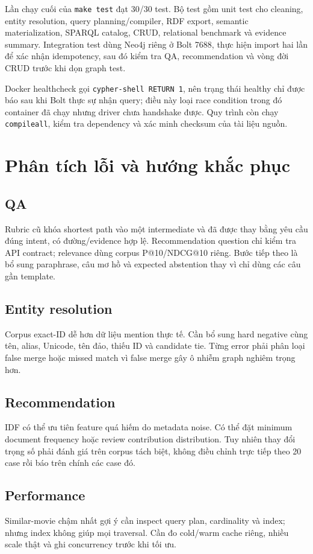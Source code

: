 Lần chạy cuối của \texttt{make test} đạt 30/30 test. Bộ test gồm unit test cho cleaning,
entity resolution, query planning/compiler, RDF export, semantic materialization,
SPARQL catalog, CRUD, relational benchmark và evidence summary. Integration test
dùng Neo4j riêng ở Bolt 7688, thực hiện import hai lần để xác nhận idempotency,
sau đó kiểm tra QA, recommendation và vòng đời CRUD trước khi dọn graph test.

Docker healthcheck gọi \texttt{cypher-shell RETURN 1}, nên trạng thái healthy chỉ được
báo sau khi Bolt thực sự nhận query; điều này loại race condition trong đó
container đã chạy nhưng driver chưa handshake được. Quy trình còn chạy
\texttt{compileall}, kiểm tra dependency và xác minh checksum của tài liệu nguồn.

\section{Phân tích lỗi và hướng khắc phục}

\subsection{QA}

Rubric cũ khóa shortest path vào một intermediate và đã được thay bằng yêu cầu
đúng intent, có đường/evidence hợp lệ. Recommendation question chỉ kiểm tra API
contract; relevance dùng corpus P@10/NDCG@10 riêng. Bước tiếp theo là bổ sung
paraphrase, câu mơ hồ và expected abstention thay vì chỉ dùng các câu gần template.

\subsection{Entity resolution}

Corpus exact-ID dễ hơn dữ liệu mention thực tế. Cần bổ sung hard negative cùng tên,
alias, Unicode, tên đảo, thiếu ID và candidate tie. Từng error phải phân loại false
merge hoặc missed match vì false merge gây ô nhiễm graph nghiêm trọng hơn.

\subsection{Recommendation}

IDF có thể ưu tiên feature quá hiếm do metadata noise. Có thể đặt minimum document
frequency hoặc review contribution distribution. Tuy nhiên thay đổi trọng số phải
đánh giá trên corpus tách biệt, không điều chỉnh trực tiếp theo 20 case rồi báo
trên chính các case đó.

\subsection{Performance}

Similar-movie chậm nhất gợi ý cần inspect query plan, cardinality và index; nhưng
index không giúp mọi traversal. Cần đo cold/warm cache riêng, nhiều scale thật và
ghi concurrency trước khi tối ưu.
